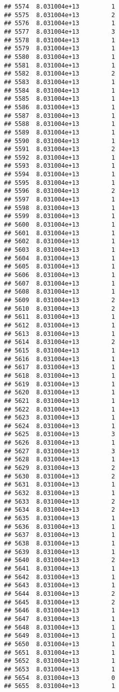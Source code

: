 \documentclass[
]{article}
\begin{document}
\begin{verbatim}
## 5574  8.031004e+13         1
## 5575  8.031004e+13         2
## 5576  8.031004e+13         1
## 5577  8.031004e+13         3
## 5578  8.031004e+13         1
## 5579  8.031004e+13         1
## 5580  8.031004e+13         1
## 5581  8.031004e+13         1
## 5582  8.031004e+13         2
## 5583  8.031004e+13         1
## 5584  8.031004e+13         1
## 5585  8.031004e+13         1
## 5586  8.031004e+13         1
## 5587  8.031004e+13         1
## 5588  8.031004e+13         1
## 5589  8.031004e+13         1
## 5590  8.031004e+13         1
## 5591  8.031004e+13         2
## 5592  8.031004e+13         1
## 5593  8.031004e+13         1
## 5594  8.031004e+13         1
## 5595  8.031004e+13         1
## 5596  8.031004e+13         2
## 5597  8.031004e+13         1
## 5598  8.031004e+13         1
## 5599  8.031004e+13         1
## 5600  8.031004e+13         1
## 5601  8.031004e+13         1
## 5602  8.031004e+13         1
## 5603  8.031004e+13         1
## 5604  8.031004e+13         1
## 5605  8.031004e+13         1
## 5606  8.031004e+13         1
## 5607  8.031004e+13         1
## 5608  8.031004e+13         1
## 5609  8.031004e+13         2
## 5610  8.031004e+13         2
## 5611  8.031004e+13         1
## 5612  8.031004e+13         1
## 5613  8.031004e+13         1
## 5614  8.031004e+13         2
## 5615  8.031004e+13         1
## 5616  8.031004e+13         1
## 5617  8.031004e+13         1
## 5618  8.031004e+13         1
## 5619  8.031004e+13         1
## 5620  8.031004e+13         1
## 5621  8.031004e+13         1
## 5622  8.031004e+13         1
## 5623  8.031004e+13         1
## 5624  8.031004e+13         1
## 5625  8.031004e+13         3
## 5626  8.031004e+13         1
## 5627  8.031004e+13         3
## 5628  8.031004e+13         1
## 5629  8.031004e+13         2
## 5630  8.031004e+13         2
## 5631  8.031004e+13         1
## 5632  8.031004e+13         1
## 5633  8.031004e+13         2
## 5634  8.031004e+13         2
## 5635  8.031004e+13         1
## 5636  8.031004e+13         1
## 5637  8.031004e+13         1
## 5638  8.031004e+13         1
## 5639  8.031004e+13         1
## 5640  8.031004e+13         2
## 5641  8.031004e+13         1
## 5642  8.031004e+13         1
## 5643  8.031004e+13         1
## 5644  8.031004e+13         2
## 5645  8.031004e+13         2
## 5646  8.031004e+13         1
## 5647  8.031004e+13         1
## 5648  8.031004e+13         1
## 5649  8.031004e+13         1
## 5650  8.031004e+13         1
## 5651  8.031004e+13         1
## 5652  8.031004e+13         1
## 5653  8.031004e+13         1
## 5654  8.031004e+13         0
## 5655  8.031004e+13         1

\end{verbatim}
\end{document}
